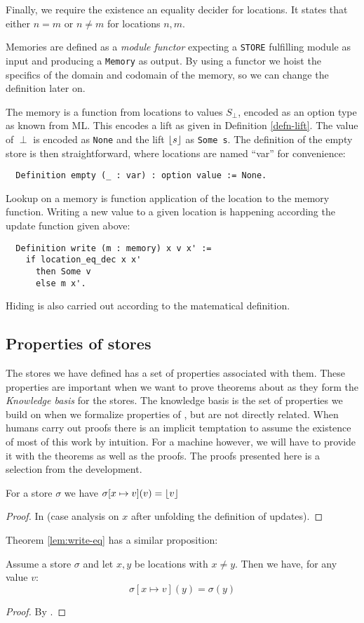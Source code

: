 Finally, we require the existence an equality decider for
locations. It states that either $n = m$ or $n \neq m$ for locations
$n, m$.

Memories are defined as a \emph{module functor} expecting a
\texttt{STORE} fulfilling module as input and producing a
\texttt{Memory} as output. By using a functor we hoist the specifics
of the domain and codomain of the memory, so we can change the
definition later on.

The memory is a function from locations to values $S_{\perp}$, encoded
as an option type as known from ML. This encodes a lift as given in
Definition \ref{defn-lift}. The value of $\perp$ is encoded as
\texttt{None} and the lift $\lfloor s \rfloor$ as \texttt{Some s}. The
definition of the empty store is then straightforward, where locations
are named ``var'' for convenience:
\begin{verbatim}
  Definition empty (_ : var) : option value := None.
\end{verbatim}
Lookup on a memory is function application of the location to the
memory function. Writing a new value to a given location is happening
according the update function given above:
\begin{verbatim}
  Definition write (m : memory) x v x' :=
    if location_eq_dec x x'
      then Some v
      else m x'.
\end{verbatim}
Hiding is also carried out according to the matematical definition.

\subsection{Properties of stores}

The stores we have defined has a set of properties associated with
them. These properties are important when we want to prove theorems
about \janusz{} as they form the \emph{Knowledge basis} for the
stores. The knowledge basis is the set of properties we build on when
we formalize properties of \janusz{}, but are not directly
related. When humans carry out proofs there is an implicit temptation
to assume the existence of most of this work by intuition. For a
machine however, we will have to provide it with the theorems as well
as the proofs. The proofs presented here is a selection from the
development.

\begin{lem}
  \label{lem:write-eq}
  For a store $\sigma$ we have $\sigma[x \mapsto v](v) = \lfloor v \rfloor$
\end{lem}
\begin{proof}
  In \coq{} (case analysis on $x$ after unfolding the definition of updates).
\end{proof}
Theorem \ref{lem:write-eq} has a similar proposition:
\begin{lem}
  Assume a store $\sigma$ and let $x, y$ be locations with $x \neq
  y$. Then we have, for any value $v$:
  \begin{equation*}
    \sigma[x \mapsto v](y) = \sigma(y)
  \end{equation*}
\end{lem}
\begin{proof}
  By \coq{}.
\end{proof}

